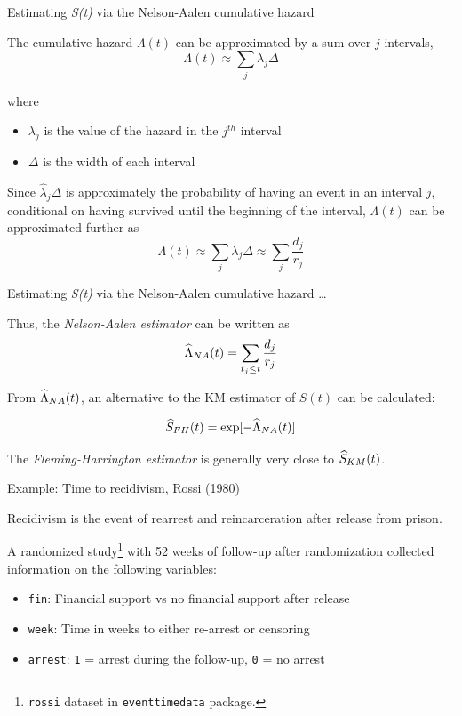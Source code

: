 \documentclass[ignorenonframetext,]{beamer}
\begin{document}
\begin{frame}{%
\protect\hypertarget{estimating-st-via-the-nelson-aalen-cumulative-hazard}{%
Estimating \emph{S(t)} via the Nelson-Aalen cumulative hazard}}

The cumulative hazard \(\Lambda(t)\) can be approximated by a sum over
\(j\) intervals, \[\Lambda(t) \approx \sum_{j}  \lambda_j  \Delta \]

where

\begin{itemize}
\item
  \(\lambda_j\) is the value of the hazard in the \(j^{th}\) interval
\item
  \(\Delta\) is the width of each interval
\end{itemize}

Since \(\widehat{\lambda}_j \Delta\) is approximately the probability of
having an event in an interval \(j\), conditional on having survived
until the beginning of the interval, \(\Lambda(t)\) can be approximated
further as
\[\Lambda(t) \approx \sum_{j}  \lambda_j  \Delta \approx \sum_{j} \frac{d_j}{r_j}  \]

\end{frame}

\begin{frame}{%
\protect\hypertarget{estimating-st-via-the-nelson-aalen-cumulative-hazard-1}{%
Estimating \emph{S(t)} via the Nelson-Aalen cumulative hazard \ldots}}

Thus, the \emph{Nelson-Aalen estimator} can be written as
\[\widehat{\Lambda}_{\tiny NA}(t) =  \sum_{t_j \leq t} \frac{d_j}{r_j} \]

From \(\widehat{\Lambda}_{\tiny NA}(t)\), an alternative to the KM
estimator of \(S(t)\) can be calculated:

\[  \widehat{S}_{\tiny FH}(t) = \exp[-\widehat{\Lambda}_{\tiny NA}(t)] \]

The \emph{Fleming-Harrington estimator} is generally very close to
\(\widehat{S}_{\tiny KM}(t)\).

\end{frame}

\begin{frame}{%
\protect\hypertarget{example-time-to-recidivism-rossi-1980}{%
Example: Time to recidivism, Rossi (1980)}}

Recidivism is the event of rearrest and reincarceration after release
from prison.

A randomized
study\footnote{\texttt{rossi} dataset in \texttt{eventtimedata} package.}
with 52 weeks of follow-up after randomization collected information on
the following variables:

\begin{itemize}
\item
  \texttt{fin}: Financial support vs no financial support after release
\item
  \texttt{week}: Time in weeks to either re-arrest or censoring
\item
  \texttt{arrest}: \texttt{1} = arrest during the follow-up, \texttt{0}
  = no arrest
\end{itemize}

\end{frame}
\end{document}
